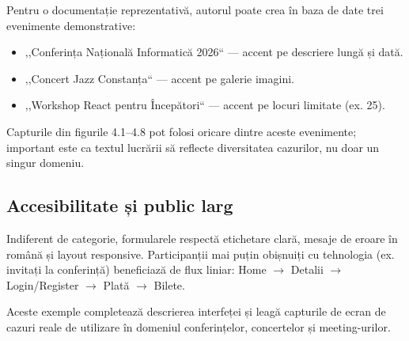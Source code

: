 Pentru o documentație reprezentativă, autorul poate crea în baza de date trei evenimente demonstrative:
\begin{itemize}
	\item ,,Conferința Națională Informatică 2026`` — accent pe descriere lungă și dată.
	\item ,,Concert Jazz Constanța`` — accent pe galerie imagini.
	\item ,,Workshop React pentru Începători`` — accent pe locuri limitate (ex. 25).
\end{itemize}

Capturile din figurile 4.1--4.8 pot folosi oricare dintre aceste evenimente; important este ca textul lucrării să reflecte diversitatea cazurilor, nu doar un singur domeniu.


\subsection{Accesibilitate și public larg}

Indiferent de categorie, formularele respectă etichetare clară, mesaje de eroare în română și layout responsive. Participanții mai puțin obișnuiți cu tehnologia (ex. invitați la conferință) beneficiază de flux liniar: Home $\rightarrow$ Detalii $\rightarrow$ Login/Register $\rightarrow$ Plată $\rightarrow$ Bilete.

Aceste exemple completează descrierea interfeței și leagă capturile de ecran de cazuri reale de utilizare în domeniul conferințelor, concertelor și meeting-urilor.